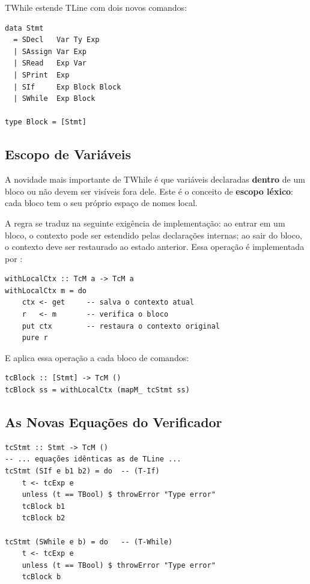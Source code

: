 TWhile estende TLine com dois novos comandos:

\begin{verbatim}
data Stmt
  = SDecl   Var Ty Exp
  | SAssign Var Exp
  | SRead   Exp Var
  | SPrint  Exp
  | SIf     Exp Block Block
  | SWhile  Exp Block

type Block = [Stmt]
\end{verbatim}

\subsection{Escopo de Variáveis}

A novidade mais importante de TWhile é que variáveis declaradas
\textbf{dentro} de um bloco  ou
 não devem ser visíveis fora dele.
Este é o conceito de \textbf{escopo léxico}: cada bloco tem o seu
próprio espaço de nomes local.

A regra se traduz na seguinte exigência de implementação: ao entrar
em um bloco, o contexto pode ser estendido pelas declarações
internas; ao sair do bloco, o contexto deve ser restaurado ao estado
anterior. Essa operação é implementada por
:

\begin{verbatim}
withLocalCtx :: TcM a -> TcM a
withLocalCtx m = do
    ctx <- get     -- salva o contexto atual
    r   <- m       -- verifica o bloco
    put ctx        -- restaura o contexto original
    pure r
\end{verbatim}

E  aplica essa operação a cada bloco
de comandos:

\begin{verbatim}
tcBlock :: [Stmt] -> TcM ()
tcBlock ss = withLocalCtx (mapM_ tcStmt ss)
\end{verbatim}

\subsection{As Novas Equações do Verificador}

\begin{verbatim}
tcStmt :: Stmt -> TcM ()
-- ... equações idênticas as de TLine ...
tcStmt (SIf e b1 b2) = do  -- (T-If)
    t <- tcExp e
    unless (t == TBool) $ throwError "Type error"
    tcBlock b1
    tcBlock b2

tcStmt (SWhile e b) = do   -- (T-While)
    t <- tcExp e
    unless (t == TBool) $ throwError "Type error"
    tcBlock b
\end{verbatim}

